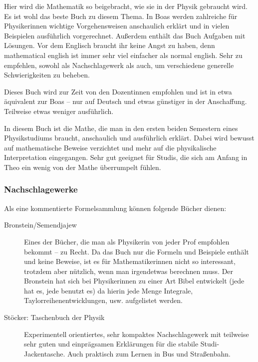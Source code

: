 \begin{description}[style=unboxed]
\item[Boas: Mathematical Methods in the Physical Science]{
		Hier wird die Mathematik so beigebracht, wie sie in der Physik gebraucht wird. Es ist wohl das beste Buch zu diesem Thema. In Boas werden zahlreiche für Physikerinnen wichtige Vorgehensweisen anschaulich erklärt und in vielen Beispielen ausführlich vorgerechnet. Außerdem enthält das Buch Aufgaben mit Lösungen. Vor dem Englisch braucht ihr keine Angst zu haben, denn mathematical english ist immer sehr viel einfacher als normal english. Sehr zu empfehlen, sowohl als Nachschlagewerk als auch, um verschiedene generelle Schwierigkeiten zu beheben.}

\item[Lang, Pucker: Mathematische Methoden in der Physik]{
		Dieses Buch wird zur Zeit von den Dozentinnen empfohlen und ist in etwa äquivalent zur Boas -- nur auf Deutsch und etwas günstiger in der Anschaffung. Teilweise etwas weniger ausführlich.}

\item[Otto: Rechenmethoden für Studierende d. Physik im ersten Jahr]{
		In diesem Buch ist die Mathe, die man in den ersten beiden Semestern eines Physikstudiums braucht, anschaulich und ausführlich erklärt. Dabei wird bewusst auf mathematische Beweise verzichtet und mehr auf die physikalische Interpretation eingegangen. Sehr gut geeignet für Studis, die sich am Anfang in Theo ein wenig von der Mathe überrumpelt fühlen.}
\end{description}




\subsubsection{Nachschlagewerke}

Als eine kommentierte Formelsammlung können folgende Bücher dienen:

\begin{description}
\item[Bronstein/Semendjajew]{
		Eines der Bücher, die man als Physikerin von jeder Prof empfohlen bekommt -- zu Recht. Da das Buch nur die Formeln und Beispiele enthält und keine Beweise, ist es für Mathematikerinnen nicht so interessant, trotzdem aber nützlich, wenn man irgendetwas berechnen muss. Der Bronstein hat sich bei Physikerinnen zu einer Art Bibel entwickelt (jede hat es, jede benutzt es) da hierin jede Menge Integrale, Taylorreihenentwicklungen, usw. aufgelistet werden.}

\item[Stöcker: Taschenbuch der Physik]{
		Experimentell orientiertes, sehr kompaktes Nachschlagewerk mit teilweise sehr guten und einprägsamen Erklärungen für die stabile Studi-Jackentasche. Auch praktisch zum Lernen in Bus und Straßenbahn.}
\end{description}


